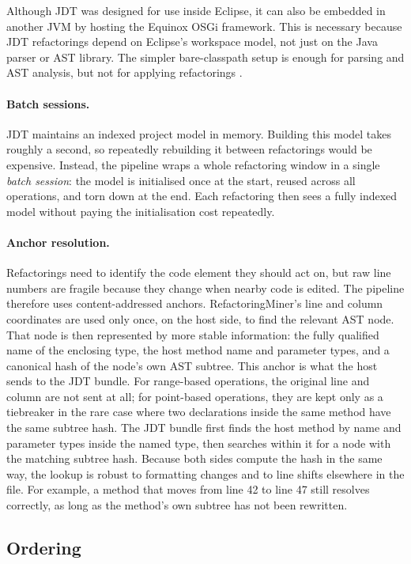 Although JDT was designed for use inside Eclipse, it can also be embedded in another JVM by hosting the Equinox OSGi framework. This is necessary because JDT refactorings depend on Eclipse's workspace model, not just on the Java parser or AST library. The simpler bare-classpath setup is enough for parsing and AST analysis, but not for applying refactorings \cite{eclipse_jdt_faq}.

\paragraph{Batch sessions.}
JDT maintains an indexed project model in memory. Building this model takes roughly a second, so repeatedly rebuilding it between refactorings would be expensive. Instead, the pipeline wraps a whole refactoring window in a single \emph{batch session}: the model is initialised once at the start, reused across all operations, and torn down at the end. Each refactoring then sees a fully indexed model without paying the initialisation cost repeatedly.

\paragraph{Anchor resolution.}
Refactorings need to identify the code element they should act on, but raw line numbers are fragile because they change when nearby code is edited. The pipeline therefore uses content-addressed anchors. RefactoringMiner's line and column coordinates are used only once, on the host side, to find the relevant AST node. That node is then represented by more stable information: the fully qualified name of the enclosing type, the host method name and parameter types, and a canonical hash of the node's own AST subtree. This anchor is what the host sends to the JDT bundle. For range-based operations, the original line and column are not sent at all; for point-based operations, they are kept only as a tiebreaker in the rare case where two declarations inside the same method have the same subtree hash. The JDT bundle first finds the host method by name and parameter types inside the named type, then searches within it for a node with the matching subtree hash. Because both sides compute the hash in the same way, the lookup is robust to formatting changes and to line shifts elsewhere in the file. For example, a method that moves from line 42 to line 47 still resolves correctly, as long as the method's own subtree has not been rewritten.

\subsection{Ordering}
\label{sec:methodology-detector-ordering}
\label{sec:methodology-reorder}

